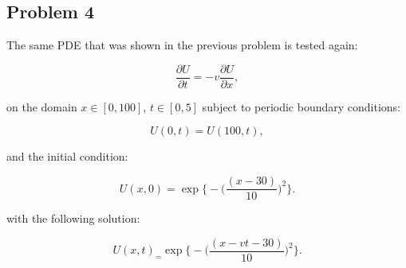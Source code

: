 \clearpage

\subsection{Problem 4}

The same PDE that was shown in the previous problem is tested again:

\begin{equation}
    \frac{\partial U}{\partial t} = -v\frac{\partial U}{\partial x},
    \label{eq:convection_PDE}
\end{equation}

\noindent on the domain $x \in [0, 100]$, $t \in [0, 5]$ subject to periodic boundary conditions:

\begin{equation}
    U(0,t) = U(100, t),
\end{equation}

\noindent and the initial condition:

\begin{equation}
    U(x,0) = \exp\bigg\{-\bigg(\frac{(x-30)}{10}\bigg)^{2}\bigg\}.
\end{equation}

\noindent with the following solution:

\begin{equation}
	U(x,t)_ = \exp\bigg\{-\bigg(\frac{(x-vt-30)}{10}\bigg)^{2}\bigg\}.
\end{equation}

